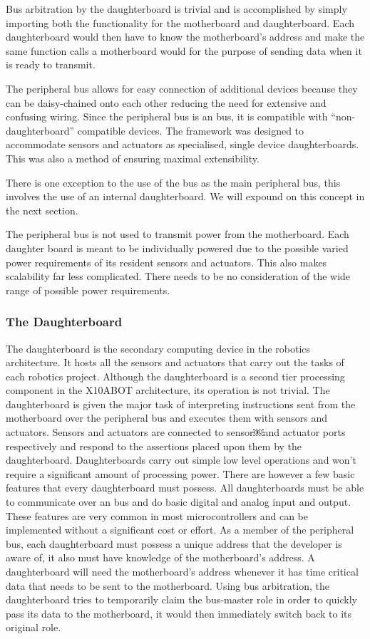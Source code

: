	Bus arbitration by the daughterboard is trivial and is accomplished by simply importing both the functionality for the motherboard and daughterboard. Each daughterboard would then have to know the motherboard's \iic address and make the same function calls a motherboard would for the purpose of sending data when it is ready to transmit.
	
	The peripheral bus allows for easy connection of additional devices because they can be daisy-chained onto each other reducing the need for extensive and confusing wiring. Since the peripheral bus is an \iic bus, it is compatible with ``non-daughterboard'' \iic compatible devices. The framework was designed to accommodate sensors and actuators as specialised, single device daughterboards. This was also a method of ensuring maximal extensibility.
	
	There is one exception to the use of the \iic bus as the main peripheral bus, this involves the use of an internal daughterboard. We will expound on this concept in the next section.

	The peripheral bus is not used to transmit power from the motherboard. Each daughter board is meant to be individually powered due to the possible varied power requirements of its resident sensors and actuators. This also makes scalability far less complicated. There needs to be no consideration of the wide range of possible power requirements.
	
	\subsubsection{The Daughterboard} %


	\label{ssub:the_daughterboard}
	The daughterboard is the secondary computing device in the \xten robotics architecture. It hosts all the sensors and actuators that carry out the tasks of each robotics project. Although the daughterboard is a second tier processing component in the X10ABOT architecture, its operation is not trivial. The daughterboard is given the major task of interpreting instructions sent from the motherboard over the peripheral bus and executes them with sensors and actuators. Sensors and actuators are connected to sensor￼and actuator ports respectively and respond to the assertions placed upon them by the daughterboard. Daughterboards carry out simple low level operations and won't require a significant amount of processing power. There are however a few basic features that every daughterboard must possess. All daughterboards must be able to communicate over an \iic bus and do basic digital and analog input and output. These features are very common in most microcontrollers and can be implemented without a significant cost or effort.
	As a member of the peripheral bus, each daughterboard must possess a unique address that the developer is aware of, it also must have knowledge of the motherboard's address. A daughterboard will need the motherboard's address whenever it has time critical data that needs to be sent to the motherboard. Using bus arbitration, the daughterboard tries to temporarily claim the bus-master role in order to quickly pass its data to the motherboard, it would then immediately switch back to its original role.
